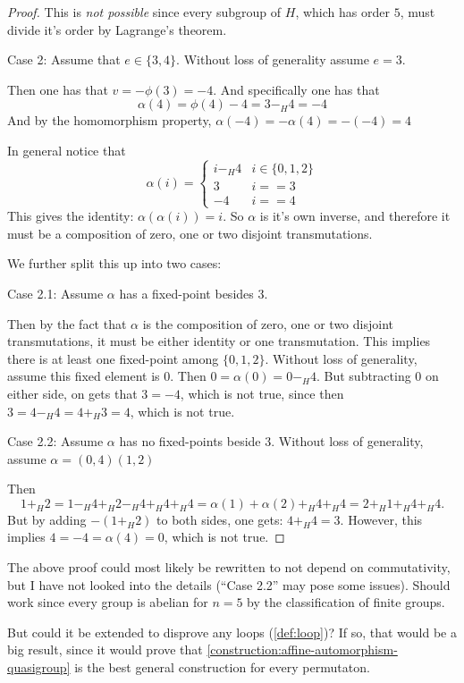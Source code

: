 \begin{proof}
    This is \emph{not possible} since every subgroup of \( H \), which has order \( 5 \), must divide it's order by Lagrange's theorem.

    Case 2: Assume that \( e \in \{ 3, 4 \} \). Without loss of generality assume \( e = 3 \).

    Then one has that \( v = -\phi(3) = -4 \). And specifically one has that
    \[
        \alpha(4) = \phi(4) - 4 = 3 -_H 4 = - 4
    \]
    And by the homomorphism property, \( \alpha(-4) = -\alpha(4) = -(-4) = 4 \)

    In general notice that
    \[
        \alpha(i) =
        \begin{cases}
            i -_H 4 & i \in \{ 0, 1, 2 \} \\
            3 & i == 3 \\
            -4 & i == 4
        \end{cases}
    \]
    This gives the identity: \( \alpha(\alpha(i)) = i \). So \( \alpha \) is it's own inverse, and therefore it must be a composition of zero, one or two disjoint transmutations.

    We further split this up into two cases:

    Case 2.1: Assume \( \alpha \) has a fixed-point besides \( 3 \).

    Then by the fact that \( \alpha \) is the composition of zero, one or two disjoint transmutations, it must be either identity or one transmutation. This implies there is at least one fixed-point among \( \{ 0, 1, 2 \} \). Without loss of generality, assume this fixed element is \( 0 \). Then \( 0 = \alpha(0) = 0 -_H 4 \). But subtracting \( 0 \) on either side, on gets that \( 3 = -4 \), which is not true, since then \( 3 = 4 -_H 4 = 4 +_H 3 = 4 \), which is not true.

    Case 2.2: Assume \( \alpha \) has no fixed-points beside \( 3 \). Without loss of generality, assume \( \alpha = (0, 4)(1, 2) \)

    Then 
    \[ 
        1 +_H 2 = 1 -_H 4 +_H 2 -_H 4 +_H 4 +_H 4 = \alpha(1) + \alpha(2) +_H 4 +_H 4 = 2 +_H 1 +_H 4 +_H 4.
    \]
    But by adding \( -(1 +_H 2) \) to both sides, one gets: \( 4 +_H 4 = 3\). However, this implies \( 4 = -4 = \alpha(4) = 0 \), which is not true.
\end{proof}

\begin{remark} \label{remark:ab-aaut-counterexample-notes}
    The above proof could most likely be rewritten to not depend on commutativity, but I have not looked into the details (``Case 2.2'' may pose some issues). Should work since every group is abelian for \( n = 5 \) by the classification of finite groups. 
    
    But could it be extended to disprove any loops (\autoref{def:loop})? If so, that would be a big result, since it would prove that \autoref{construction:affine-automorphism-quasigroup} is the best general construction for every permutaton.
\end{remark}